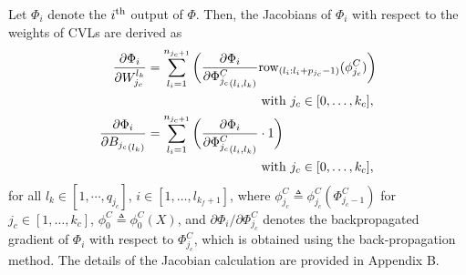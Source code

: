 \documentclass[letterpaper, 10 pt, conference]{ieeeconf}  %
\begin{document}
Let $\Phi_i$ denote the $i\textsuperscript{th}$ output of $\Phi$.
Then, the Jacobians of $\Phi_i$ with respect to the weights of CVLs are derived as
\begin{equation}
    \begin{aligned}
        {\partial \Phi_i\over\partial W^{l_k}_{j_c}} 
        &=
        \sum_{l_i=1}^{n_{j_c+1}}
        \bigg(
        {\partial \Phi_i\over\partial {\Phi^C_{j_c}}_{(l_i,l_k)}} 
            \text{row}_{(l_i:l_i+p_{j_c}-1)}(\phi^C_{j_c})
        \bigg)
        \\
         &\hspace{90pt}\text{with }j_c\in[0,\dots,k_c],\hfilneg\\        
        {\partial \Phi_i\over\partial {B_{j_c}}_{(l_k)}} &=
        \sum_{l_i=1}^{n_{j_c+1}} 
        \bigg(
            {\partial \Phi_i\over\partial {\Phi^C_{j_c}}_{(l_i,l_k)}} \cdot 1
        \bigg)
        \\
         &\hspace{90pt}\text{with }j_c\in[0,\dots,k_c],\hfilneg
    \end{aligned}
\end{equation}
for all $l_k\in[1,\cdots,q_{j_c}]$, $i\in[1,\dots,l_{k_f+1}]$, where $\phi^C_{j_c}\triangleq\phi^C_{j_c}(\Phi^C_{j_c-1})$ for $j_c\in[1,\dots,k_c]$, $\phi^C_0 \triangleq \phi^C_0(X)$, and $\partial \Phi_i/\partial \Phi^C_{j_c}$ denotes the backpropagated gradient of $\Phi_i$ with respect to $\Phi^C_{j_c}$, which is obtained using the back-propagation method. The details of the Jacobian calculation are provided in Appendix B.
\end{document}
